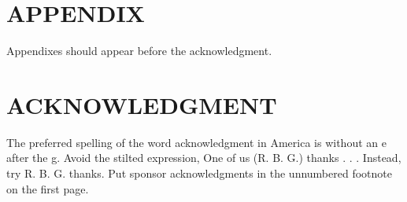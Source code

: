 \documentclass[letterpaper, 10pt, conference]{ieeeconf}   %
\begin{document}
\begin{CJK*}{UTF8}{bsmi}






\section*{APPENDIX}

Appendixes should appear before the acknowledgment.

\section*{ACKNOWLEDGMENT}

The preferred spelling of the word acknowledgment in America is without an e after the g. Avoid the stilted expression, One of us (R. B. G.) thanks . . .  Instead, try R. B. G. thanks. Put sponsor acknowledgments in the unnumbered footnote on the first page.





\end{CJK*}
\end{document}
